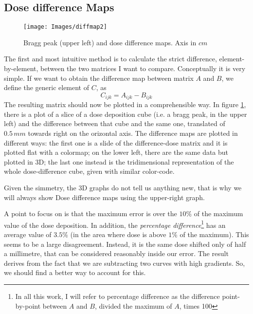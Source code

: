 \documentclass[12pt, a4paper, twoside]{book}
\begin{document}
\subsection{Dose difference Maps}
\begin{figure}[t!]
\texttt{[image: Images/diffmap2]}
\caption{Bragg peak (upper left) and dose difference maps. Axis in $cm$}
\label{fig:diff}
\end{figure}
The first and most intuitive method is to calculate the strict difference, element-by-element, between the two matrices I want to compare. Conceptually it is very simple. If we want to obtain the difference map between matrix $A$ and $B$, we define the generic element of $C$, as
\[
C_{ijk} = A_{ijk} - B_{ijk}
\]
The resulting matrix should now be plotted in a comprehensible way. In figure \ref{fig:diff}, there is a plot of a slice of a dose deposition cube (i.e. a bragg peak, in the upper left) and the difference between that cube and the same one, translated of $0.5\,mm$ towards right on the orizontal axis. 
The difference maps are plotted in different ways: the first one is a slide of the difference-dose matrix and it is plotted flat with a colormap; on the lower left, there are the same data but plotted in 3D; the last one instead is the tridimensional representation of the whole dose-difference cube, given with similar color-code.

Given the simmetry, the 3D graphs do not tell us anything new, that is why we will always show Dose difference maps using the upper-right graph.

A point to focus on is that the maximum error is over the $10\%$ of the maximum value of the dose deposition. In addition, the \emph{percentage difference}\footnote{In all this work, I will refer to percentage difference as the difference point-by-point between $A$ and $B$, divided the maximum of $A$, times 100} has an average value of $3.5\%$ (in the area where dose is above $1\%$ of the maximum). 
This seems to be a large disagreement. Instead, it is the same dose shifted only of half a millimetre, that can be considered reasonably inside our error. The result derives from the fact that we are subtracting two curves with high gradients. So, we should find a better way to account for this.
\end{document}
